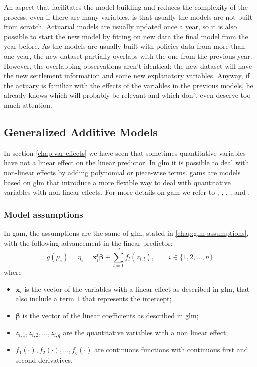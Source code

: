\documentclass[a4paper, twoside, openright, 12pt]{report}
\providecommand{\tightlist}{%
  \setlength{\itemsep}{0pt}\setlength{\parskip}{0pt}}
\theoremstyle{definition}
\theoremstyle{definition}
\theoremstyle{definition}
\theoremstyle{remark}
\begin{document}
An aspect that facilitates the model building and reduces the complexity of the process, even if there are many variables, is that usually the models are not built from scratch. Actuarial models are usually updated once a year, so it is also possible to start the new model by fitting on new data the final model from the year before. As the models are usually built with policies data from more than one year, the new dataset partially overlaps with the one from the previous year. However, the overlapping observations aren't identical: the new dataset will have the new settlement information and some new explanatory variables. Anyway, if the actuary is familiar with the effects of the variables in the previous models, he already knows which will probably be relevant and which don't even deserve too much attention.

\newpage

\hypertarget{chap:gam}{%
\subsection{Generalized Additive Models}\label{chap:gam}}

In section \ref{chap:var-effects} we have seen that sometimes quantitative variables have not a linear effect on the linear predictor. In \ac{glm} it is possible to deal with non-linear effects by adding polynomial or piece-wise terms. \ac{gam}s are models based on \ac{glm} that introduce a more flexible way to deal with quantitative variables with non-linear effects. For more details on \ac{gam} we refer to \autocite{wuthrich-data-analytics}, \autocite{james2013introduction}, \autocite{friedman2001elements}, \autocite{ruppert2003semiparametric}, \autocite{wood2017generalized} and \autocite{sica-2016}.

\hypertarget{model-assumptions}{%
\subsubsection{Model assumptions}\label{model-assumptions}}

In \ac{gam}, the assumptions are the same of \ac{glm}, stated in \ref{chap:glm-assumptions}, with the following advancement in the linear predictor:
\[
g(\mu_i) = \eta_i = \boldsymbol{x}_i^t \boldsymbol{\beta} + \sum_{l=1}^{q}{f_l(z_{i,l})}, \qquad i\in\{1,2,\dots,n\}
\]
where

\begin{itemize}
\tightlist
\item
  \(\boldsymbol{x}_i\) is the vector of the variables with a linear effect as described in \ac{glm}, that also include a term \(1\) that represents the intercept;
\item
  \(\boldsymbol{\beta}\) is the vector of the linear coefficients as described in \ac{glm};
\item
  \(z_{i,1}, z_{i,2}, \dots, z_{i,q}\) are the quantitative variables with a non linear effect;
\item
  \(f_1(\cdot), f_2(\cdot), \dots, f_q(\cdot)\) are continuous functions with continuous first and second derivatives.
\end{itemize}
\end{document}
